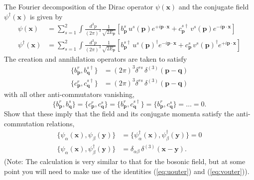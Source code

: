 The Fourier decomposition of the Dirac operator $\psi(\mathbf{x})$ and the conjugate field $\psi^\dagger(\mathbf{x})$ is given by
\begin{align}
    \psi(\mathbf{x}) &= \sum_{s=1}^{2}\int\frac{d^3p}{(2\pi)^3}\frac{1}{\sqrt{2E_{\mathbf{p}}}}\left[b^s_{\mathbf{p}}\,u^s(\mathbf{p})e^{+i\mathbf{p}\cdot\mathbf{x}} + c^{s\dagger}_{\mathbf{p}}\,v^s(\mathbf{p})e^{-i\mathbf{p}\cdot\mathbf{x}}\right]\\
    \psi^\dagger(\mathbf{x}) &= \sum_{s=1}^{2}\int\frac{d^3p}{(2\pi)^3}\frac{1}{\sqrt{2E_{\mathbf{p}}}}\left[b^{s\dagger}_{\mathbf{p}}\,u^s(\mathbf{p})^\dagger e^{-i\mathbf{p}\cdot\mathbf{x}} + c^s_{\mathbf{p}}\,v^s(\mathbf{p})^\dagger e^{+i\mathbf{p}\cdot\mathbf{x}}\right]
\end{align}
The creation and annihilation operators are taken to satisfy
\begin{align}
    \{b^r_{\mathbf{p}}, b^{s\dagger}_{\mathbf{q}}\} &= (2\pi)^3\delta^{rs}\,\delta^{(3)}(\mathbf{p}-\mathbf{q})\\
    \{c^r_{\mathbf{p}}, c^{s\dagger}_{\mathbf{q}}\} &= (2\pi)^3\delta^{rs}\,\delta^{(3)}(\mathbf{p}-\mathbf{q})
\end{align}
with all other anti-commutators vanishing,
\begin{equation}
    \{b^r_{\mathbf{p}}, b^s_{\mathbf{q}}\} = \{c^r_{\mathbf{p}}, c^s_{\mathbf{q}}\} = \{b^r_{\mathbf{p}}, c^{s\dagger}_{\mathbf{q}}\} = \{b^r_{\mathbf{p}}, c^s_{\mathbf{q}}\} = \ldots = 0.
\end{equation}
Show that these imply that the field and its conjugate momenta satisfy the anti-commutation relations,
\begin{align}
    \{\psi_\alpha(\mathbf{x}), \psi_\beta(\mathbf{y})\} &= \{\psi^\dagger_\alpha(\mathbf{x}), \psi^\dagger_\beta(\mathbf{y})\} = 0\\
    \{\psi_\alpha(\mathbf{x}), \psi^\dagger_\beta(\mathbf{y})\} &= \delta_{\alpha\beta}\,\delta^{(3)}(\mathbf{x}-\mathbf{y}).
\end{align}
(Note: The calculation is very similar to that for the bosonic field, but at some point you will need to make use of the identities (\ref{eq:uouter}) and (\ref{eq:vouter})).


